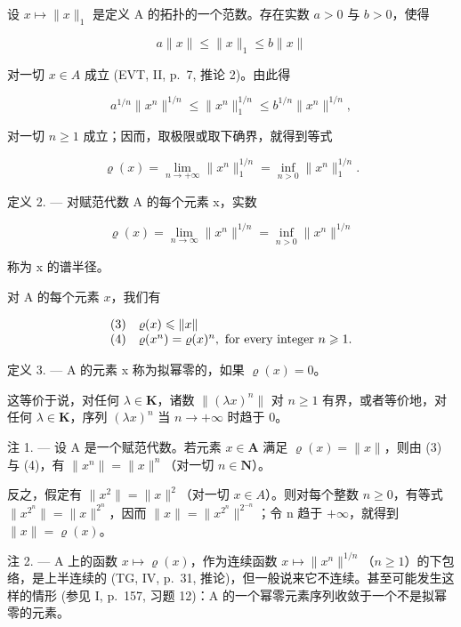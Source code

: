 设 \(x \mapsto \|x\|_1\) 是定义 A 的拓扑的一个范数。存在实数 \(a > 0\) 与 \(b > 0\)，使得

\[
a \| x \| \leqslant \| x \| _ {1} \leqslant b \| x \|
\]

对一切 \(x \in A\) 成立 (EVT, II, p.~7, 推论 2)。由此得

\[
a ^ {1 / n} \| x ^ {n} \| ^ {1 / n} \leqslant \| x ^ {n} \| _ {1} ^ {1 / n} \leqslant b ^ {1 / n} \| x ^ {n} \| ^ {1 / n},
\]

对一切 \(n \geqslant 1\) 成立；因而，取极限或取下确界，就得到等式

\[
\varrho (x) = \lim _ {n \to + \infty} \| x ^ {n} \| _ {1} ^ {1 / n} = \inf _ {n > 0} \| x ^ {n} \| _ {1} ^ {1 / n}.
\]

定义 2. --- 对赋范代数 A 的每个元素 x，实数

\[
\varrho (x) = \lim _ {n \to \infty} \| x ^ {n} \| ^ {1 / n} = \inf _ {n > 0} \| x ^ {n} \| ^ {1 / n}
\]

称为 x 的谱半径。

对 A 的每个元素 \(x\)，我们有

\[
\begin{array}{r l} (3) & \varrho (x) \leqslant \| x \| \\ (4) & \varrho (x ^ {n}) = \varrho (x) ^ {n}, \text { for every integer } n \geqslant 1. \end{array}
\]

定义 3. --- A 的元素 x 称为拟幂零的，如果 \(\varrho(x)=0\)。

这等价于说，对任何 \(\lambda \in \mathbf{K}\)，诸数 \(\| (\lambda x)^n\|\) 对 \(n\geqslant 1\) 有界，或者等价地，对任何 \(\lambda \in \mathbf{K}\)，序列 \((\lambda x)^n\) 当 \(n\to +\infty\) 时趋于 0。

注 1. --- 设 A 是一个赋范代数。若元素 \(x \in \mathbf{A}\) 满足 \(\varrho(x) = \|x\|\)，则由 (3) 与 (4)，有 \(\|x^n\| = \|x\|^n\)（对一切 \(n \in \mathbf{N}\)）。

反之，假定有 \(\|x^{2}\|=\|x\|^{2}\)（对一切 \(x\in A\)）。则对每个整数 \(n\geqslant0\)，有等式 \(\|x^{2^{n}}\|=\|x\|^{2^{n}}\)，因而 \(\|x\|=\|x^{2^{n}}\|^{2^{-n}}\)；令 n 趋于 \(+\infty\)，就得到 \(\|x\|=\varrho(x)\)。

注 2. --- A 上的函数 \(x \mapsto \varrho(x)\)，作为连续函数 \(x \mapsto \|x^n\|^{1/n}\)（\(n \geqslant 1\)）的下包络，是上半连续的 (TG, IV, p.~31, 推论)，但一般说来它不连续。甚至可能发生这样的情形 (参见 I, p.~157, 习题 12)：A 的一个幂零元素序列收敛于一个不是拟幂零的元素。

